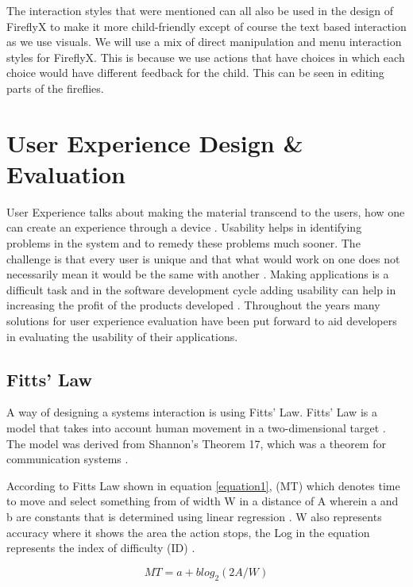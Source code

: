The interaction styles that were mentioned can all also be used in the design of FireflyX to make it more child-friendly except of course the text based interaction as we use visuals. We will use a mix of direct manipulation and menu interaction styles for FireflyX. This is because we use actions that have choices in which each choice would have different feedback for the child. This can be seen in editing parts of the fireflies. 


\section{User Experience Design \& Evaluation}
User Experience talks about making the material transcend to the users, how one can create an experience through a device \cite{stephanidis2012encyclopedia}. Usability helps in identifying problems in the system and to remedy these problems much sooner. The challenge is that every user is unique and that what would work on one does not necessarily mean it would be the same with another \cite{tidwell2010designing}. Making applications is a difficult task and in the software development cycle adding usability can help in increasing the profit of the products developed \cite{bellamy2011deploying}. Throughout the years many solutions for user experience evaluation have been put forward to aid developers in evaluating the usability of their applications. 
    
\subsection{Fitts' Law}
A way of designing a systems interaction is using Fitts' Law. Fitts' Law is a model that takes into account human movement in a two-dimensional target \cite{mackenzie1992extending}. The model was derived from Shannon's Theorem 17, which was a theorem for communication systems \cite{mackenzie1992fitts}. 

According to Fitts Law shown in equation \ref{equation1}, (MT) which denotes time to move and select something from of width W in a distance of A wherein a and b are constants that is determined using linear regression \cite{mackenzie1992extending}. W also represents accuracy where it shows the area the action stops, the Log in the equation represents the index of difficulty (ID) \cite{mackenzie1992extending}. 

\begin{equation}
  MT = a + b log_{2}(2A/W) 
  \label{equation1}
\end{equation}


